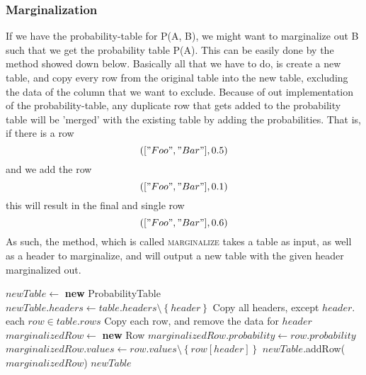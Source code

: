 \documentclass[10pt,a4paper]{article}
\begin{document}
\subsubsection{Marginalization}
If we have the probability-table for P(A, B), we might want to marginalize out B such that we get the probability table P(A). This can be easily done by the method showed down below. Basically all that we have to do, is create a new table, and copy every row from the original table into the new table, excluding the data of the column that we want to exclude. Because of out implementation of the probability-table, any duplicate row that gets added to the probability table will be 'merged' with the existing table by adding the probabilities. That is, if there is a row $$(["Foo", "Bar"], 0.5)$$ and we add the row $$(["Foo", "Bar"], 0.1)$$ this will result in the final and single row $$(["Foo", "Bar"], 0.6)$$ As such, the method, which is called \textsc{marginalize} takes a table as input, as well as a header to marginalize, and will output a new table with the given header marginalized out.
\begin{codebox}
\li $newTable \gets $ \textbf{new} ProbabilityTable
\li $newTable.headers \gets table.headers \setminus \left\{ header \right\}$ \Comment Copy all headers, except $header$.
\zi
\li \For each $row \in table.rows$ \Comment Copy each row, and remove the data for $header$ \Do
\li     $marginalizedRow \gets $ \textbf{new} Row
\li     $marginalizedRow.probability \gets row.probability$
\li     $marginalizedRow.values \gets row.values \setminus \left\{ row[header] \right\}$
\li     $newTable$.{\sc addRow}($marginalizedRow$)
    \End
\zi
\li \Return $newTable$
\end{codebox}
\end{document}

